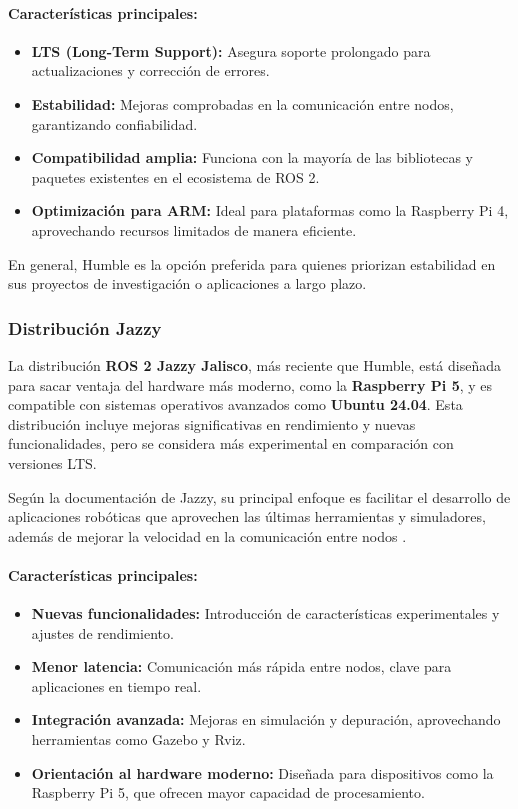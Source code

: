    \paragraph{Características principales:}  
    \begin{itemize}
        \item \textbf{LTS (Long-Term Support):} Asegura soporte prolongado para actualizaciones y corrección de errores.
        \item \textbf{Estabilidad:} Mejoras comprobadas en la comunicación entre nodos, garantizando confiabilidad.
        \item \textbf{Compatibilidad amplia:} Funciona con la mayoría de las bibliotecas y paquetes existentes en el ecosistema de ROS 2.
        \item \textbf{Optimización para ARM:} Ideal para plataformas como la Raspberry Pi 4, aprovechando recursos limitados de manera eficiente.
    \end{itemize}
    
    En general, Humble es la opción preferida para quienes priorizan estabilidad en sus proyectos de investigación o aplicaciones a largo plazo.
    
    \subsubsection{Distribución Jazzy}
    
    La distribución \textbf{ROS 2 Jazzy Jalisco}, más reciente que Humble, está diseñada para sacar ventaja del hardware más moderno, como la \textbf{Raspberry Pi 5}, y es compatible con sistemas operativos avanzados como \textbf{Ubuntu 24.04}. Esta distribución incluye mejoras significativas en rendimiento y nuevas funcionalidades, pero se considera más experimental en comparación con versiones LTS.
    
    Según la documentación de Jazzy, su principal enfoque es facilitar el desarrollo de aplicaciones robóticas que aprovechen las últimas herramientas y simuladores, además de mejorar la velocidad en la comunicación entre nodos \cite{jazzy_documentation}.
    
    \paragraph{Características principales:}  
    \begin{itemize}
        \item \textbf{Nuevas funcionalidades:} Introducción de características experimentales y ajustes de rendimiento.
        \item \textbf{Menor latencia:} Comunicación más rápida entre nodos, clave para aplicaciones en tiempo real.
        \item \textbf{Integración avanzada:} Mejoras en simulación y depuración, aprovechando herramientas como Gazebo y Rviz.
        \item \textbf{Orientación al hardware moderno:} Diseñada para dispositivos como la Raspberry Pi 5, que ofrecen mayor capacidad de procesamiento.
    \end{itemize}

